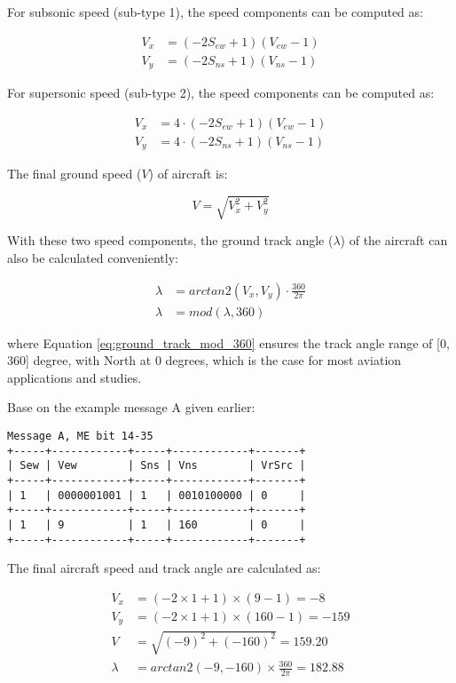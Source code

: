 For subsonic speed (sub-type 1), the speed components can be computed as:

\begin{align}
  V_x &= (-2S_{ew} + 1) (V_{ew} - 1) \\
  V_y &= (-2S_{ns} + 1) (V_{ns} - 1)
\end{align}

For supersonic speed (sub-type 2), the speed components can be computed as:

\begin{align}
  V_x &= 4 \cdot (-2S_{ew} + 1) (V_{ew} - 1)\\
  V_y &= 4 \cdot (-2S_{ns} + 1) (V_{ns} - 1)
\end{align}


The final ground speed ($V$) of aircraft is:

\begin{equation}
  V = \sqrt{V_x^2 + V_y^2}
\end{equation}

With these two speed components, the ground track angle ($\lambda$) of the aircraft can also be calculated conveniently:

\begin{align}
  \lambda &= arctan2 \left( V_x, V_y \right) \cdot \frac{360}{2\pi} \\
  \lambda &= mod(\lambda, 360) \label{eq:ground_track_mod_360}
\end{align}

where Equation \ref{eq:ground_track_mod_360} ensures the track angle range of [0, 360] degree, with North at 0 degrees, which is the case for most aviation applications and studies.

Base on the example message A given earlier:

\begin{verbatim}
Message A, ME bit 14-35
+-----+------------+-----+------------+-------+
| Sew | Vew        | Sns | Vns        | VrSrc |
+-----+------------+-----+------------+-------+
| 1   | 0000001001 | 1   | 0010100000 | 0     |
+-----+------------+-----+------------+-------+
| 1   | 9          | 1   | 160        | 0     |
+-----+------------+-----+------------+-------+
\end{verbatim}

The final aircraft speed and track angle are calculated as:

\begin{align}
  V_x &= (-2 \times 1 + 1) \times (9 - 1)  = -8 \\
  V_y &= (-2 \times 1 + 1) \times (160 - 1) = -159 \\
  V &= \sqrt{(-9)^2+ (-160)^2} = 159.20 \\
  \lambda &= arctan2(-9, -160) \times \frac{360}{2\pi} = 182.88
\end{align}

